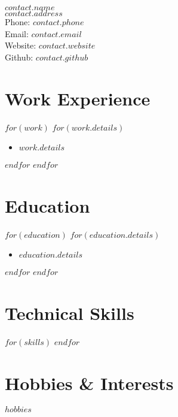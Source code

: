 \documentclass{cv-class}
\begin{document}
{\LARGE $contact.name$}\\
$contact.address$\\
Phone: $contact.phone$\\
Email: $contact.email$\\
Website: $contact.website$\\
Github: $contact.github$

\section*{Work Experience}
$for(work)$
$for(work.details)$
\begin{itemize}
  \item $work.details$
\end{itemize}
$endfor$
$endfor$

\section*{Education}
$for(education)$
$for(education.details)$
\begin{itemize}
  \item $education.details$
\end{itemize}
$endfor$
$endfor$

\section*{Technical Skills}
$for(skills)$
$endfor$

\section*{Hobbies \& Interests}
$hobbies$
\end{document}
